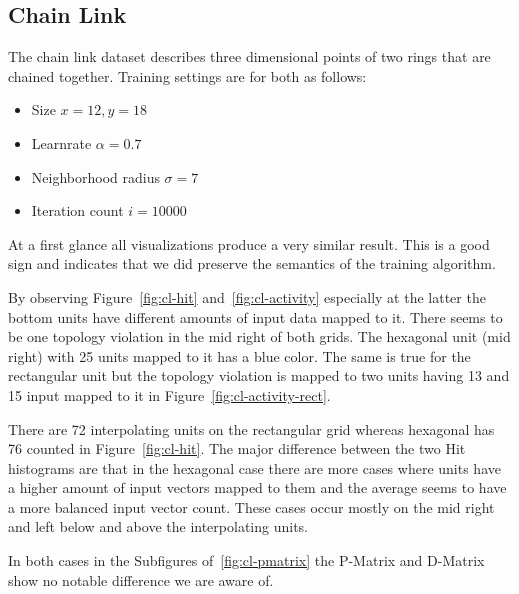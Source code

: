 \documentclass{acm_proc_article-sp}
\begin{document}
\subsection{Chain Link}
\label{sec:chain-link}

The chain link dataset describes three dimensional points of two rings that are chained together. Training settings are for both as follows:
\begin{itemize}
	\item Size $x = 12, y = 18$
	\item Learnrate $\alpha = 0.7$
	\item Neighborhood radius $\sigma = 7$
	\item Iteration count $i = 10000$
\end{itemize}

At a first glance all visualizations produce a very similar result. This is a good sign and indicates that we did preserve the semantics of the training algorithm.


By observing Figure~\ref{fig:cl-hit} and~\ref{fig:cl-activity} especially at the latter the
bottom units have different amounts of input data mapped to it. There seems to be one topology
violation in the mid right of both grids. The hexagonal unit (mid right) with 25 units mapped to it has a blue
color. The same is true for the rectangular unit but the topology violation is mapped to two units
having 13 and 15 input mapped to it in Figure~\ref{fig:cl-activity-rect}.

There are 72 interpolating units on the rectangular grid whereas hexagonal has 76 counted in Figure~\ref{fig:cl-hit}. The major difference between the two Hit histograms are that in the
hexagonal case there are more cases where units have a higher amount of input vectors mapped
to them and the average seems to have a more balanced input vector count. These cases occur mostly
on the mid right and left below and above the interpolating units.


In both cases in the Subfigures of~\ref{fig:cl-pmatrix} the P-Matrix and D-Matrix show no notable difference we are aware of.
\end{document}
